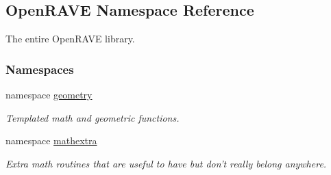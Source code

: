 \hypertarget{namespaceOpenRAVE}{
\subsection{OpenRAVE Namespace Reference}
\label{namespaceOpenRAVE}
}


The entire OpenRAVE library.  


\subsubsection*{Namespaces}
\begin{DoxyCompactItemize}
\item 
namespace \hyperlink{namespaceOpenRAVE_1_1geometry}{geometry}


\begin{DoxyCompactList}\small\item\em Templated math and geometric functions. \item\end{DoxyCompactList}

\item 
namespace \hyperlink{namespaceOpenRAVE_1_1mathextra}{mathextra}


\begin{DoxyCompactList}\small\item\em Extra math routines that are useful to have but don't really belong anywhere. \item\end{DoxyCompactList}

\end{DoxyCompactItemize}

